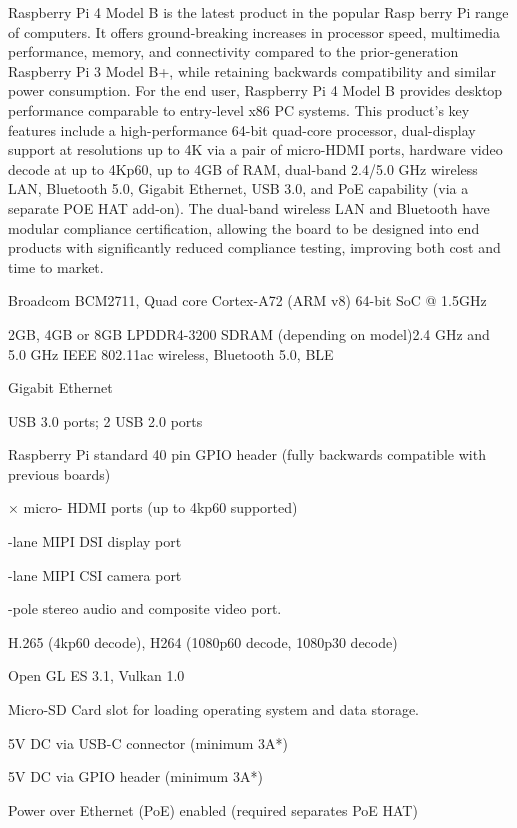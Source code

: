 \documentclass[12pt,a4paper]{report}
\begin{document}
\noindent Raspberry Pi 4 Model B is the latest product in the popular Rasp berry Pi range of computers. It offers ground-breaking increases in processor speed, multimedia performance, memory, and connectivity compared to the prior-generation Raspberry Pi 3 Model B+, while retaining backwards compatibility and similar power consumption. For the end user, Raspberry Pi 4 Model B provides desktop performance comparable to entry-level x86 PC systems. This product's key features include a high-performance 64-bit quad-core processor, dual-display support at resolutions up to 4K via a pair of micro-HDMI ports, hardware video decode at up to 4Kp60, up to 4GB of RAM, dual-band 2.4/5.0 GHz wireless LAN, Bluetooth 5.0, Gigabit Ethernet, USB 3.0, and PoE capability (via a separate POE HAT add-on). The dual-band wireless LAN and Bluetooth have modular compliance certification, allowing the board to be designed into end products with significantly reduced compliance testing, improving both cost and time to market.

\noindent  Broadcom BCM2711, Quad core Cortex-A72 (ARM v8) 64-bit SoC @ 1.5GHz

\noindent  2GB, 4GB or 8GB LPDDR4-3200 SDRAM (depending on model)2.4 GHz and 5.0 GHz IEEE 802.11ac wireless, Bluetooth 5.0, BLE

\noindent  Gigabit Ethernet

 USB 3.0 ports; 2 USB 2.0 ports

\noindent  Raspberry Pi standard 40 pin GPIO header (fully backwards compatible with previous boards)

 $\mathrm{\times}$ micro- HDMI ports (up to 4kp60 supported)

-lane MIPI DSI display port 

-lane MIPI CSI camera port

-pole stereo audio and composite video port.

\noindent  H.265 (4kp60 decode), H264 (1080p60 decode, 1080p30 decode)

\noindent  Open GL ES 3.1, Vulkan 1.0

\noindent  Micro-SD Card slot for loading operating system and data storage.

\noindent  5V DC via USB-C connector (minimum 3A*)

\noindent  5V DC via GPIO header (minimum 3A*)

\noindent  Power over Ethernet (PoE) enabled (required separates PoE HAT)
\end{document}
